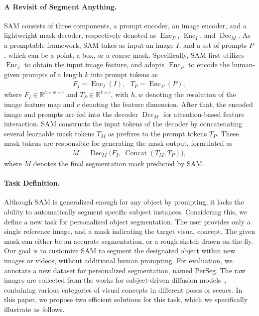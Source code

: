 \documentclass{article} \usepackage{iclr2024_conference,times}
\begin{document}
\paragraph{A Revisit of Segment Anything.} 
SAM consists of three components, a prompt encoder, an image encoder, and a lightweight mask decoder, respectively denoted as $\operatorname{Enc}_P$, $\operatorname{Enc}_I$, and $\operatorname{Dec}_M$. 
As a promptable framework, SAM takes as input an image $I$, and a set of prompts $P$, which can be a point, a box, or a coarse mask. Specifically, SAM first utilizes $\operatorname{Enc}_I$ to obtain the input image feature, and adopts $\operatorname{Enc}_P$ to encode the human-given prompts of a length $k$ into prompt tokens as
\begin{align}
    F_I = \operatorname{Enc}_I(I),\ \ \ T_P = \operatorname{Enc}_P(P),
\end{align}
where $F_I \in \mathbb{R}^{h\times w\times c}$ and $T_P \in \mathbb{R}^{k\times c}$, with $h, w$ denoting the resolution of the image feature map and $c$ denoting the feature dimension.
After that, the encoded image and prompts are fed into the decoder $\operatorname{Dec}_M$ for attention-based feature interaction. SAM constructs the input tokens of the decoder by concatenating several learnable mask tokens $T_M$ as prefixes to the prompt tokens $T_P$. These mask tokens are responsible for generating the mask output, formulated as
\begin{align}
    M = \operatorname{Dec}_M\Big(F_I,\ \operatorname{Concat}(T_M, T_P)\Big),
\label{input_tokens}
\end{align}
where $M$ denotes the final segmentation mask predicted by SAM.

\paragraph{Task Definition.} 
Although SAM is generalized enough for any object by prompting, it lacks the ability to automatically segment specific subject instances. Considering this, we define a new task for personalized object segmentation. The user provides only a single reference image, and a mask indicating the target visual concept. The given mask can either be an accurate segmentation, or a rough sketch drawn on-the-fly. Our goal is to customize SAM to segment the designated object within new images or videos, without additional human prompting. 
For evaluation, we annotate a new dataset for personalized segmentation, named PerSeg. The raw images are collected from the works for subject-driven diffusion models~\citep{gal2022image,ruiz2022dreambooth,kumari2022multi}, containing various categories of visual concepts in different poses or scenes. In this paper, we propose two efficient solutions for this task, which we specifically illustrate as follows.
\end{document}

